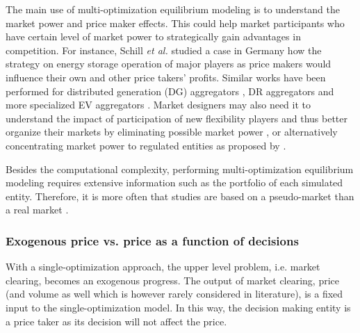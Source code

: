 The main use of multi-optimization equilibrium modeling is to understand the market power and price maker effects. This could help market participants who have certain level of market power to strategically gain advantages in competition. For instance, Schill \textit{et al.} \cite{Schill2011} studied a case in Germany how the strategy on energy storage operation of major players as price makers would influence their own and other price takers' profits. Similar works have been performed for distributed generation (DG) aggregators \cite{Zhang2016}, DR aggregators \cite{HenriquezAuba2017} and more specialized EV aggregators \cite{Shafie-Khah2015}. Market designers may also need it to understand the impact of participation of new flexibility players and thus better organize their markets by eliminating possible market power \cite{Mohsenian-Rad2016,Vespermann2017,Huang2017}, or alternatively concentrating market power to regulated entities as proposed by \cite{He2012}.

Besides the computational complexity, performing multi-optimization equilibrium modeling requires extensive information such as the portfolio of each simulated entity. Therefore, it is more often that studies are based on a pseudo-market  \cite{Kardakos2013,Shafie-Khah2015,HenriquezAuba2017} than a real market \cite{Schill2011}.



\subsubsection{Exogenous price vs. price as a function of decisions}

With a single-optimization approach, the upper level problem, i.e. market clearing, becomes an exogenous progress. The output of market clearing, price (and volume as well which is however rarely considered in literature), is a fixed input to the single-optimization model. In this way, the decision making entity is a price taker as its decision will not affect the price. 

